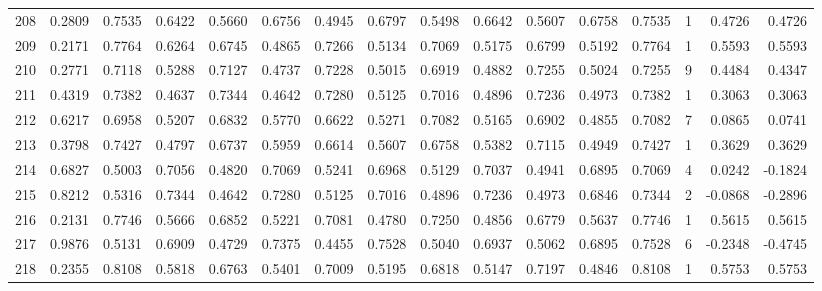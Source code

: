 \begin{tabular}{lrrrrrrrrrrrrrrr}
208 &      0.2809 &  0.7535 &  0.6422 &  0.5660 &  0.6756 &  0.4945 &  0.6797 &  0.5498 &  0.6642 &  0.5607 &   0.6758 &     0.7535 &      1 &                    0.4726 &                     0.4726 \\
209 &      0.2171 &  0.7764 &  0.6264 &  0.6745 &  0.4865 &  0.7266 &  0.5134 &  0.7069 &  0.5175 &  0.6799 &   0.5192 &     0.7764 &      1 &                    0.5593 &                     0.5593 \\
210 &      0.2771 &  0.7118 &  0.5288 &  0.7127 &  0.4737 &  0.7228 &  0.5015 &  0.6919 &  0.4882 &  0.7255 &   0.5024 &     0.7255 &      9 &                    0.4484 &                     0.4347 \\
211 &      0.4319 &  0.7382 &  0.4637 &  0.7344 &  0.4642 &  0.7280 &  0.5125 &  0.7016 &  0.4896 &  0.7236 &   0.4973 &     0.7382 &      1 &                    0.3063 &                     0.3063 \\
212 &      0.6217 &  0.6958 &  0.5207 &  0.6832 &  0.5770 &  0.6622 &  0.5271 &  0.7082 &  0.5165 &  0.6902 &   0.4855 &     0.7082 &      7 &                    0.0865 &                     0.0741 \\
213 &      0.3798 &  0.7427 &  0.4797 &  0.6737 &  0.5959 &  0.6614 &  0.5607 &  0.6758 &  0.5382 &  0.7115 &   0.4949 &     0.7427 &      1 &                    0.3629 &                     0.3629 \\
214 &      0.6827 &  0.5003 &  0.7056 &  0.4820 &  0.7069 &  0.5241 &  0.6968 &  0.5129 &  0.7037 &  0.4941 &   0.6895 &     0.7069 &      4 &                    0.0242 &                    -0.1824 \\
215 &      0.8212 &  0.5316 &  0.7344 &  0.4642 &  0.7280 &  0.5125 &  0.7016 &  0.4896 &  0.7236 &  0.4973 &   0.6846 &     0.7344 &      2 &                   -0.0868 &                    -0.2896 \\
216 &      0.2131 &  0.7746 &  0.5666 &  0.6852 &  0.5221 &  0.7081 &  0.4780 &  0.7250 &  0.4856 &  0.6779 &   0.5637 &     0.7746 &      1 &                    0.5615 &                     0.5615 \\
217 &      0.9876 &  0.5131 &  0.6909 &  0.4729 &  0.7375 &  0.4455 &  0.7528 &  0.5040 &  0.6937 &  0.5062 &   0.6895 &     0.7528 &      6 &                   -0.2348 &                    -0.4745 \\
218 &      0.2355 &  0.8108 &  0.5818 &  0.6763 &  0.5401 &  0.7009 &  0.5195 &  0.6818 &  0.5147 &  0.7197 &   0.4846 &     0.8108 &      1 &                    0.5753 &                     0.5753 \\

\end{tabular}
